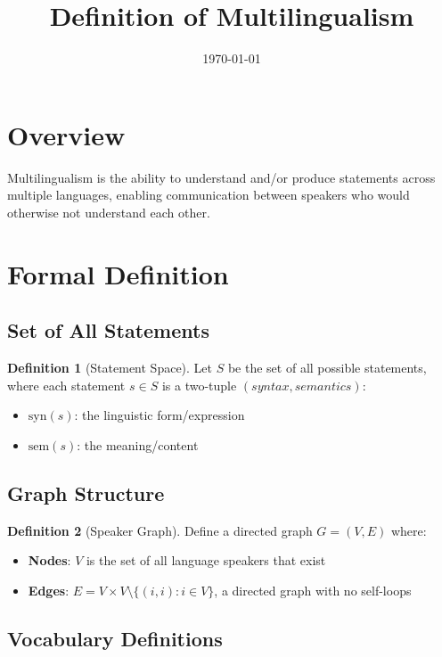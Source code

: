 \documentclass[12pt,a4paper]{article}
\title{Definition of Multilingualism}
\author{}
\date{\today}
\theoremstyle{definition}
\newtheorem{definition}{Definition}
\begin{document}
\maketitle

\section{Overview}

Multilingualism is the ability to understand and/or produce statements across multiple languages, enabling communication between speakers who would otherwise not understand each other.

\section{Formal Definition}

\subsection{Set of All Statements}

\begin{definition}[Statement Space]
Let $S$ be the set of all possible statements, where each statement $s \in S$ is a two-tuple $(syntax, semantics)$:
\begin{itemize}
    \item $\text{syn}(s)$: the linguistic form/expression
    \item $\text{sem}(s)$: the meaning/content
\end{itemize}
\end{definition}

\subsection{Graph Structure}

\begin{definition}[Speaker Graph]
Define a directed graph $G = (V, E)$ where:
\begin{itemize}
    \item \textbf{Nodes}: $V$ is the set of all language speakers that exist
    \item \textbf{Edges}: $E = V \times V \setminus \{(i,i) : i \in V\}$, a directed graph with no self-loops
\end{itemize}
\end{definition}

\subsection{Vocabulary Definitions}
\end{document}
